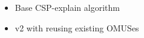 \begin{itemize}
    \item Base CSP-explain algorithm
    \item v2 with reusing existing OMUSes
\end{itemize}